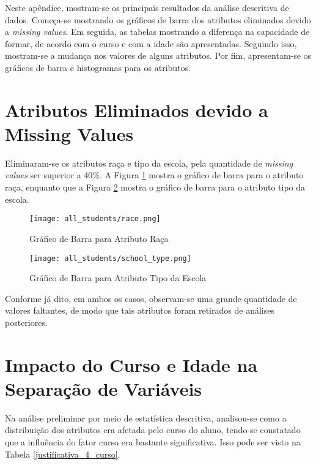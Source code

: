 Neste apêndice, mostram-se os principais resultados da análise descritiva de dados. 
Começa-se mostrando os gráficos de barra dos atributos eliminados devido a
\textit{missing values}. Em seguida, as tabelas mostrando a diferença na capacidade
de formar, de acordo com o curso e com a idade são apresentadas. Seguindo isso,
mostram-se a mudança nos valores de alguns atributos. Por fim, apresentam-se os
gráficos de barra e histogramas para os atributos. 

\section{Atributos Eliminados devido a Missing Values} \label{graf_miss_value}
\par Eliminaram-se os atributos raça e tipo da escola, pela quantidade de
\textit{missing values}
ser superior a 40\%.  A Figura \ref{atr_race} mostra o gráfico de barra para o
atributo raça, enquanto que a Figura \ref{atr_school_type} mostra o gráfico de barra
para o atributo tipo da escola.  
    \begin{figure}[!ht]
        \centering
        \texttt{[image: all\_students/race.png]}
        \caption{Gráfico de Barra para Atributo Raça}
        \label{atr_race}
    \end{figure}

    \begin{figure}[!ht]
        \centering
        \texttt{[image: all\_students/school\_type.png]}
        \caption{Gráfico de Barra para Atributo Tipo da Escola}
        \label{atr_school_type}
    \end{figure}

Conforme já dito, em ambos os casos, observam-se uma grande quantidade de valores
faltantes, de modo que tais atributos foram retirados de análises posteriores. 

\section{Impacto do Curso e Idade na Separação de Variáveis} \label{justificativa_4_base_dados}
Na análise preliminar por meio de estatística descritiva, analisou-se como a
distribuição dos atributos era afetada pelo curso do aluno, tendo-se constatado que a
influência do fator curso era bastante significativa. Isso pode ser visto na Tabela
\ref{justificativa_4_curso}.

